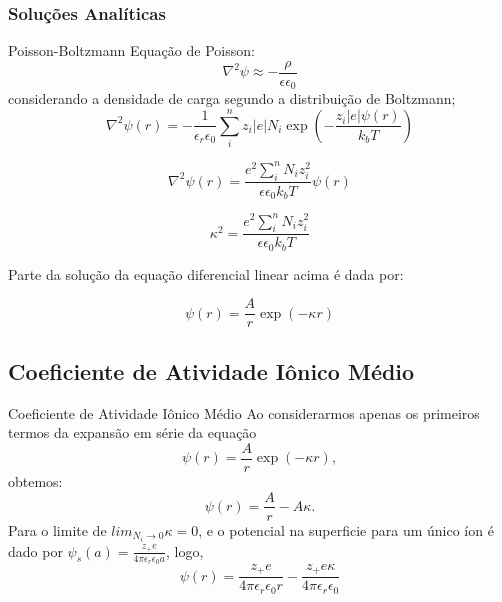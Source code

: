 \documentclass{beamer}
\begin{document}
\subsubsection{Soluções Analíticas}
\begin{frame}{Poisson-Boltzmann}
	Equação de Poisson:
	\begin{equation}
           \nabla^2 \psi \approx -\frac{\rho}{\epsilon \epsilon_0}
        \end{equation}
considerando a densidade de carga segundo a distribuição de Boltzmann;
\begin{equation}
	\nabla^2 \psi(r) = -\frac{1}{\epsilon_{r}\epsilon_{0}}{\sum_{i}^{n}z_i |e|N_{i}\exp\left(-\frac{z_i |e|\psi(r)}{{k_b}T}\right)}
\end{equation}

\begin{equation}
	\nabla^2 \psi(r) = \frac{e^{2} \sum_{i}^{n} N_i z_{i}^{2}}{ \epsilon \epsilon_0 k_b T }{\psi(r)} 
\end{equation}

	\begin{equation}
		\kappa^{2} =   \frac{e^{2} \sum_{i}^{n} N_i z_{i}^{2}}{ \epsilon \epsilon_0 k_b T }
	\end{equation}


	Parte da solução da equação diferencial linear  acima é dada por:

	\begin{equation}
\psi(r) = \frac{A}{r}\exp(-\kappa r)
\end{equation}

\end{frame}

\subsection{Coeficiente de Atividade Iônico Médio}
\begin{frame}{Coeficiente de Atividade Iônico Médio}
Ao considerarmos apenas os primeiros termos da expansão em série da equação 
\begin{equation}
\psi(r) = \frac{A}{r}\exp(-\kappa r),
\end{equation}
	obtemos:
	\begin{equation}
            \psi(r) = \frac{A}{r} - {A\kappa}.
	\end{equation}
	Para o limite de $lim_{N_i\to 0} {\kappa} = 0 $, e o potencial na superficie para um único 
	íon é	dado por $\psi_s(a) = \frac{z_{+}e }{4\pi\epsilon_r \epsilon_0 a} $, logo,
	\begin{equation}
		\label{pdhll}
		\psi(r) =  \frac{z_{+}e }{4\pi\epsilon_r \epsilon_0 r} -   \frac{z_{+}e \kappa}{4\pi\epsilon_r \epsilon_0 } 
	\end{equation}
\end{frame}
\end{document}
